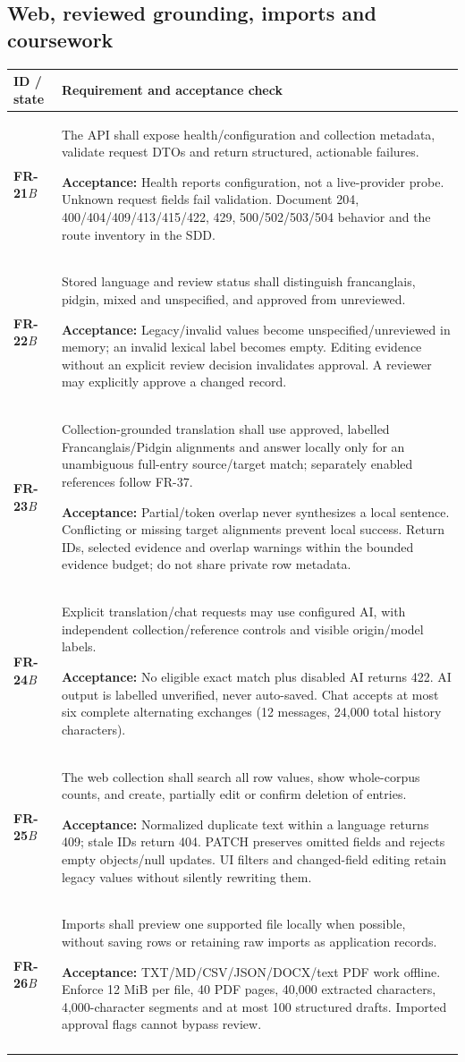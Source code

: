 \documentclass[11pt,a4paper]{article}
\newcommand{\requirement}[4]{\textbf{#1}\newline\textit{#2} & #3\par\smallskip\textbf{Acceptance:} #4\\\addlinespace}
\begin{document}
\subsection{Web, reviewed grounding, imports and coursework}
\begin{longtable}{L{1.8cm}L{12.5cm}}
\toprule\textbf{ID / state} & \textbf{Requirement and acceptance check}\\\midrule\endhead
\requirement{FR-21}{B}
{The API shall expose health/configuration and collection metadata, validate request DTOs and return structured, actionable failures.}
{Health reports configuration, not a live-provider probe. Unknown request fields fail validation. Document 204, 400/404/409/413/415/422, 429, 500/502/503/504 behavior and the route inventory in the SDD.}
\requirement{FR-22}{B}
{Stored language and review status shall distinguish francanglais, pidgin, mixed and unspecified, and approved from unreviewed.}
{Legacy/invalid values become unspecified/unreviewed in memory; an invalid lexical label becomes empty. Editing evidence without an explicit review decision invalidates approval. A reviewer may explicitly approve a changed record.}
\requirement{FR-23}{B}
{Collection-grounded translation shall use approved, labelled Francanglais/Pidgin alignments and answer locally only for an unambiguous full-entry source/target match; separately enabled references follow FR-37.}
{Partial/token overlap never synthesizes a local sentence. Conflicting or missing target alignments prevent local success. Return IDs, selected evidence and overlap warnings within the bounded evidence budget; do not share private row metadata.}
\requirement{FR-24}{B}
{Explicit translation/chat requests may use configured AI, with independent collection/reference controls and visible origin/model labels.}
{No eligible exact match plus disabled AI returns 422. AI output is labelled unverified, never auto-saved. Chat accepts at most six complete alternating exchanges (12 messages, 24,000 total history characters).}
\requirement{FR-25}{B}
{The web collection shall search all row values, show whole-corpus counts, and create, partially edit or confirm deletion of entries.}
{Normalized duplicate text within a language returns 409; stale IDs return 404. PATCH preserves omitted fields and rejects empty objects/null updates. UI filters and changed-field editing retain legacy values without silently rewriting them.}
\requirement{FR-26}{B}
{Imports shall preview one supported file locally when possible, without saving rows or retaining raw imports as application records.}
{TXT/MD/CSV/JSON/DOCX/text PDF work offline. Enforce 12 MiB per file, 40 PDF pages, 40,000 extracted characters, 4,000-character segments and at most 100 structured drafts. Imported approval flags cannot bypass review.}

\end{longtable}
\end{document}
